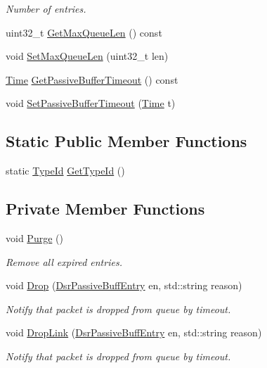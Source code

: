 \begin{DoxyCompactItemize}
\begin{DoxyCompactList}\small\item\em Number of entries. \end{DoxyCompactList}\item 
uint32\+\_\+t \hyperlink{classns3_1_1dsr_1_1DsrPassiveBuffer_ac4f3de4a1b49197edf24e9d69dbe6e1c}{Get\+Max\+Queue\+Len} () const 
\item 
void \hyperlink{classns3_1_1dsr_1_1DsrPassiveBuffer_a49bc9ad5010d5154896413888ab176bf}{Set\+Max\+Queue\+Len} (uint32\+\_\+t len)
\item 
\hyperlink{classns3_1_1Time}{Time} \hyperlink{classns3_1_1dsr_1_1DsrPassiveBuffer_afada5073cadb8ae7ea76c5f311e4e935}{Get\+Passive\+Buffer\+Timeout} () const 
\item 
void \hyperlink{classns3_1_1dsr_1_1DsrPassiveBuffer_a1a3079e030a527f694f099774833bd72}{Set\+Passive\+Buffer\+Timeout} (\hyperlink{classns3_1_1Time}{Time} t)
\end{DoxyCompactItemize}
\subsection*{Static Public Member Functions}
\begin{DoxyCompactItemize}
\item 
static \hyperlink{classns3_1_1TypeId}{Type\+Id} \hyperlink{classns3_1_1dsr_1_1DsrPassiveBuffer_af45a624c405b232f89884d0e4552aea6}{Get\+Type\+Id} ()
\end{DoxyCompactItemize}
\subsection*{Private Member Functions}
\begin{DoxyCompactItemize}
\item 
void \hyperlink{classns3_1_1dsr_1_1DsrPassiveBuffer_a8426eccf47ee009ccedd2f7c224ec203}{Purge} ()
\begin{DoxyCompactList}\small\item\em Remove all expired entries. \end{DoxyCompactList}\item 
void \hyperlink{classns3_1_1dsr_1_1DsrPassiveBuffer_ad6ef40ffc4ab1bfc535d65f840e9161b}{Drop} (\hyperlink{classns3_1_1dsr_1_1DsrPassiveBuffEntry}{Dsr\+Passive\+Buff\+Entry} en, std\+::string reason)
\begin{DoxyCompactList}\small\item\em Notify that packet is dropped from queue by timeout. \end{DoxyCompactList}\item 
void \hyperlink{classns3_1_1dsr_1_1DsrPassiveBuffer_a4f34fba66050251fd52fedae8cac3258}{Drop\+Link} (\hyperlink{classns3_1_1dsr_1_1DsrPassiveBuffEntry}{Dsr\+Passive\+Buff\+Entry} en, std\+::string reason)
\begin{DoxyCompactList}\small\item\em Notify that packet is dropped from queue by timeout. \end{DoxyCompactList}\end{DoxyCompactItemize}
